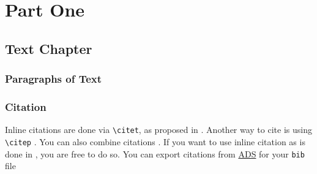 \documentclass[11pt,fleqn]{book} %
\begin{document}


\pagestyle{empty} %

\tableofcontents %

\cleardoublepage %

\pagestyle{fancy} %


\part{Part One}



\chapter{Text Chapter}

\section{Paragraphs of Text}

\lipsum[1-3] %


\section{Citation}
Inline citations are done via \verb|\citet|, as proposed in \citet{article_key}. Another way to cite is using \verb|\citep| \citep{book_key}. You can also combine citations \citep{article_key, book_key}. If you want to use inline citation as is done in \citet{article_key, book_key}, you are free to do so. You can export citations from \href{https://ui.adsabs.harvard.edu/}{ADS} for your \texttt{bib} file
\end{document}
